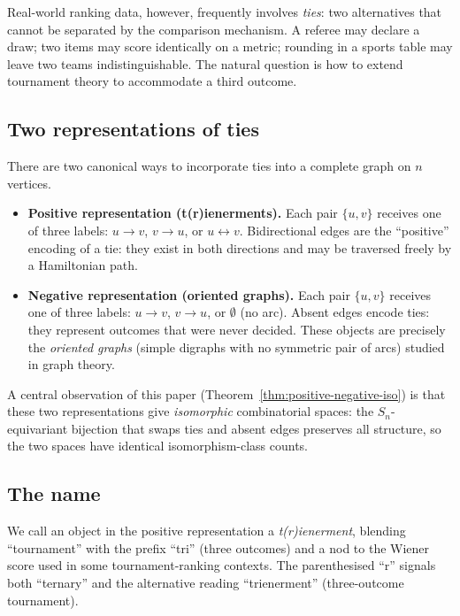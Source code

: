 \documentclass[12pt,reqno]{amsart}
\theoremstyle{definition}
\theoremstyle{plain}
\begin{document}
Real-world ranking data, however, frequently involves \emph{ties}: two
alternatives that cannot be separated by the comparison mechanism.  A referee
may declare a draw; two items may score identically on a metric; rounding in
a sports table may leave two teams indistinguishable.  The natural question
is how to extend tournament theory to accommodate a third outcome.

\subsection{Two representations of ties}

There are two canonical ways to incorporate ties into a complete graph on $n$
vertices.

\begin{itemize}
\item \textbf{Positive representation (t(r)ienerments).}
  Each pair $\{u,v\}$ receives one of three labels: $u\to v$, $v\to u$, or
  $u\leftrightarrow v$.  Bidirectional edges are the ``positive'' encoding of a
  tie: they exist in both directions and may be traversed freely by a
  Hamiltonian path.

\item \textbf{Negative representation (oriented graphs).}
  Each pair $\{u,v\}$ receives one of three labels: $u\to v$, $v\to u$, or
  $\emptyset$ (no arc).  Absent edges encode ties: they represent outcomes that
  were never decided.  These objects are precisely the \emph{oriented graphs}
  (simple digraphs with no symmetric pair of arcs) studied in graph theory.
\end{itemize}

A central observation of this paper (Theorem~\ref{thm:positive-negative-iso})
is that these two representations give \emph{isomorphic} combinatorial spaces:
the $S_n$-equivariant bijection that swaps ties and absent edges preserves all
structure, so the two spaces have identical isomorphism-class counts.

\subsection{The name}

We call an object in the positive representation a \emph{t(r)ienerment},
blending ``tournament'' with the prefix ``tri'' (three outcomes) and a nod to
the Wiener score used in some tournament-ranking contexts.  The parenthesised
``r'' signals both ``ternary'' and the alternative reading ``trienerment''
(three-outcome tournament).
\end{document}
